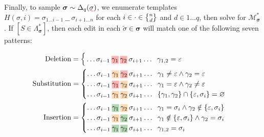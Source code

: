 \documentclass[sigplan,review,anonymous,acmsmall]{acmart}\settopmatter{printfolios=false,printccs=false,printacmref=false}
\begin{document}
Finally, to sample $\bm{\sigma}\sim\Delta_{q}(\err{\sigma})$, we enumerate templates $H(\sigma, i) = \sigma_{1\ldots i-1}\:\text{\_ \_}\:\sigma_{i+1\ldots n}$ for each $i \in \cdot \in \stirlingii{n}{d}$ and $d \in 1\ldots q$, then solve for $\mathcal{M}_{\bm\sigma}^*$. If $[S \in \Lambda^*_{\bm\sigma}]$, then each edit in each $\tilde{\sigma} \in \bm\sigma$ will match one of the following seven patterns:\vspace{-10pt}

\begin{align*}
    \text{Deletion}&=\begin{cases}
                         \,\ldots\sigma_{i-1}\:\text{\hlred{$\gamma_1$}\:\hlred{$\gamma_2$}}\:\sigma_{i+1}\ldots\hspace{0.2cm}\gamma_{1, 2} = \varepsilon\label{eq:del}
    \end{cases}\\
    \text{Substitution}&=\begin{cases}
                             \ldots\sigma_{i-1}\:\text{\hlorange{$\gamma_1$}\:\hlred{$\gamma_2$}}\:\sigma_{i+1}\ldots\hspace{0.2cm}\gamma_1 \neq \varepsilon \land \gamma_2 = \varepsilon\\
                             \ldots\sigma_{i-1}\:\text{\hlred{$\gamma_1$}\:\hlorange{$\gamma_2$}}\:\sigma_{i+1}\ldots\hspace{0.2cm}\gamma_1 = \varepsilon \land \gamma_2 \neq \varepsilon\\
                             \ldots\sigma_{i-1}\:\text{\hlorange{$\gamma_1$}\:\hlorange{$\gamma_2$}}\:\sigma_{i+1}\ldots\hspace{0.2cm}\{\gamma_1, \gamma_2\}\cap\{\varepsilon, \sigma_i\} = \varnothing
    \end{cases}\\
    \text{Insertion}&=\begin{cases}
                          \ldots\sigma_{i-1}\:\text{\hlgreen{$\gamma_1$}\:\hlorange{$\gamma_2$}}\:\sigma_{i+1}\ldots\hspace{0.2cm}\gamma_1 = \sigma_i \land \gamma_2 \notin \{\varepsilon,  \sigma_i\}\label{eq:ins2}\\
                          \ldots\sigma_{i-1}\:\text{\hlorange{$\gamma_1$}\:\hlgreen{$\gamma_2$}}\:\sigma_{i+1}\ldots\hspace{0.2cm}\gamma_1 \notin \{\varepsilon, \sigma_i\} \land \gamma_2 = \sigma_i\label{eq:ins1}\\
                          \ldots\sigma_{i-1}\:\text{\hlgreen{$\gamma_1$}\:\hlgreen{$\gamma_2$}}\:\sigma_{i+1}\ldots\hspace{0.2cm}\gamma_{1,2} = \sigma_i\label{eq:copy}
    \end{cases}
\end{align*}
\end{document}
